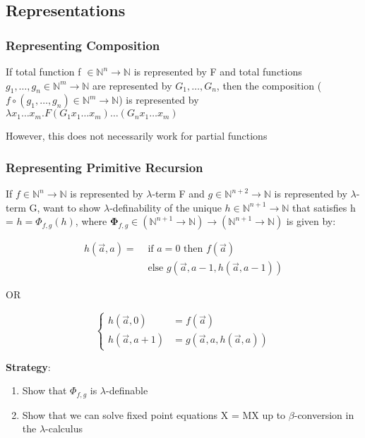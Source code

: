 \documentclass{article}
\begin{document}
\subsection{Representations}
\subsubsection{Representing Composition}
If total function f $\in \mathbb{N}^{n} \rightarrow \mathbb{N}$ is represented by F and total functions $g_{1}, \ldots, g_{n} \in \mathbb{N}^{m} \rightarrow \mathbb{N}$ are represented by $G_{1}, \dots, G_{n}$, then the composition ($f \circ\left(g_{1}, \ldots, g_{n}\right) \in \mathbb{N}^{m} \rightarrow \mathbb{N}$) is represented by $\lambda x_{1} \ldots x_{m} . F\left(G_{1} x_{1} \ldots x_{m}\right) \ldots\left(G_{n} x_{1} \ldots x_{m}\right)$

However, this does not necessarily work for partial functions

\subsubsection{Representing Primitive Recursion}
If $f \in \mathbb{N}^{n} \rightarrow \mathbb{N}$ is represented by $\lambda$-term F and $g \in \mathbb{N}^{n+2} \rightarrow \mathbb{N}$ is represented by $\lambda$-term G, want to show $\lambda$-definability of the unique $h \in \mathbb{N}^{n+1} \rightarrow \mathbb{N}$ that satisfies h = $h=\Phi_{f, g}(h)$, where $\mathbf{\Phi}_{f, g} \in\left(\mathbb{N}^{n+1} \rightarrow \mathbb{N}\right) \rightarrow\left(\mathbb{N}^{n+1} \rightarrow \mathbb{N}\right)$ is given by:

\begin{equation}
\begin{aligned} h(\vec{a}, a)=& \text { if } a=0 \text { then } f(\vec{a}) \\ & \text { else } g(\vec{a}, a-1, h(\vec{a}, a-1)) \end{aligned}
\end{equation}

OR

\begin{equation}
\left\{\begin{array}{ll}{h(\vec{a}, 0)} & {=f(\vec{a})} \\ {h(\vec{a}, a+1)} & {=g(\vec{a}, a, h(\vec{a}, a))}\end{array}\right.
\end{equation}

\textbf{Strategy}:
\begin{enumerate}
    \item Show that $\Phi_{f, g}$ is $\lambda$-definable
    \item Show that we can solve fixed point equations X = MX up to $\beta$-conversion in the $\lambda$-calculus
\end{enumerate}
\end{document}
